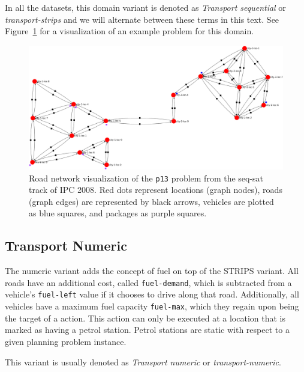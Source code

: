 In all the datasets, this domain variant is denoted as \textit{Transport sequential}
or \textit{transport-strips} and we will alternate between these terms in this text. See Figure~\ref{fig:ipc08_seq-sat_p13} for a visualization of an example problem for this domain.

\begin{figure}[tbp]
\begin{center}
\includegraphics[width=1.0\textwidth]{../img/ipc08_seq-sat_p13_land2}
\end{center}
\caption[Road network visualization of the \texttt{p13} problem from the seq-sat track of IPC 2008.]{Road network visualization of the \texttt{p13} problem from the seq-sat track of IPC 2008.
Red dots represent locations (graph nodes), roads (graph edges) are represented by black arrows, vehicles are plotted as blue squares, and packages as purple squares.}
\label{fig:ipc08_seq-sat_p13}
\end{figure}

\subsection{Transport Numeric}\label{transport-numeric}

The numeric variant adds the concept of fuel on top of the STRIPS variant.
All roads have an additional cost, called \verb+fuel-demand+, which is
subtracted from a vehicle's \verb+fuel-left+ value if it chooses to drive along that road.
Additionally, all vehicles have a maximum fuel capacity \verb+fuel-max+,
which they regain upon being the target of a  action. This action can only
be executed at a location that is marked as having a petrol station. Petrol stations
are static with respect to a given planning problem instance.

This variant is usually denoted as \textit{Transport numeric} or \textit{transport-numeric}.

